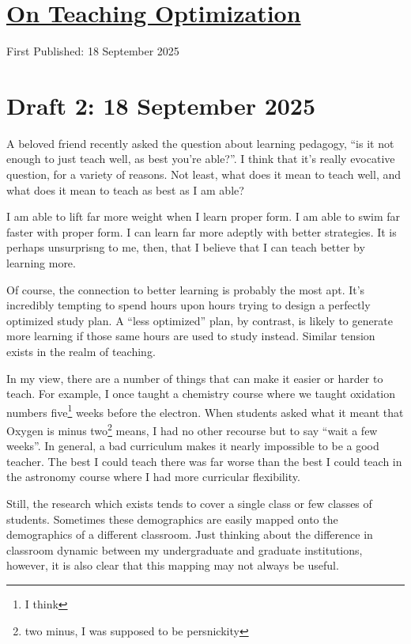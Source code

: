 \documentclass[12pt]{article}
\newcommand{\say}[1]{``#1''}
\renewcommand{\,}{\textsuperscript{,}}
\begin{document}
  
\doublespacing  
\section{\href{teaching-optimization.html}{On Teaching Optimization}}  
First Published: 18 September 2025

\section{Draft 2: 18 September 2025}
A beloved friend recently asked the question about learning pedagogy, \say{is it not enough to just teach well, as best you're able?}.
I think that it's really evocative question, for a variety of reasons.
Not least, what does it mean to teach well, and what does it mean to teach as best as I am able?

I am able to lift far more weight when I learn proper form.
I am able to swim far faster with proper form.
I can learn far more adeptly with better strategies.
It is perhaps unsurprisng to me, then, that I believe that I can teach better by learning more.

Of course, the connection to better learning is probably the most apt.
It's incredibly tempting to spend hours upon hours trying to design a perfectly optimized study plan.
A \say{less optimized} plan, by contrast, is likely to generate more learning if those same hours are used to study instead.
Similar tension exists in the realm of teaching.

In my view, there are a number of things that can make it easier or harder to teach.
For example, I once taught a chemistry course where we taught oxidation numbers five\footnote{I think} weeks before the electron.
When students asked what it meant that Oxygen is minus two\footnote{two minus, I was supposed to be persnickity} means, I had no other recourse but to say \say{wait a few weeks}.
In general, a bad curriculum makes it nearly impossible to be a good teacher.
The best I could teach there was far worse than the best I could teach in the astronomy course where I had more curricular flexibility.

Still, the research which exists tends to cover a single class or few classes of students.
Sometimes these demographics are easily mapped onto the demographics of a different classroom.
Just thinking about the difference in classroom dynamic between my undergraduate and graduate institutions, however, it is also clear that this mapping may not always be useful.
\end{document}
